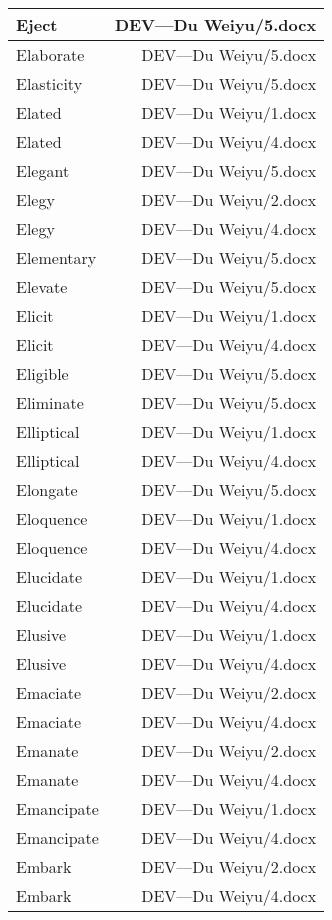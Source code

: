 \documentclass{article}
\begin{document}
\begin{center}
\begin{longtable}{|l|r|}
\hline
Eject  &  DEV---Du Weiyu/5.docx\\  
\hline
Elaborate  &  DEV---Du Weiyu/5.docx\\  
\hline
Elasticity  &  DEV---Du Weiyu/5.docx\\  
\hline
Elated  &  DEV---Du Weiyu/1.docx\\  
\hline
Elated  &  DEV---Du Weiyu/4.docx\\  
\hline
Elegant  &  DEV---Du Weiyu/5.docx\\  
\hline
Elegy  &  DEV---Du Weiyu/2.docx\\  
\hline
Elegy  &  DEV---Du Weiyu/4.docx\\  
\hline
Elementary  &  DEV---Du Weiyu/5.docx\\  
\hline
Elevate  &  DEV---Du Weiyu/5.docx\\  
\hline
Elicit  &  DEV---Du Weiyu/1.docx\\  
\hline
Elicit  &  DEV---Du Weiyu/4.docx\\  
\hline
Eligible  &  DEV---Du Weiyu/5.docx\\  
\hline
Eliminate  &  DEV---Du Weiyu/5.docx\\  
\hline
Elliptical  &  DEV---Du Weiyu/1.docx\\  
\hline
Elliptical  &  DEV---Du Weiyu/4.docx\\  
\hline
Elongate  &  DEV---Du Weiyu/5.docx\\  
\hline
Eloquence  &  DEV---Du Weiyu/1.docx\\  
\hline
Eloquence  &  DEV---Du Weiyu/4.docx\\  
\hline
Elucidate  &  DEV---Du Weiyu/1.docx\\  
\hline
Elucidate  &  DEV---Du Weiyu/4.docx\\  
\hline
Elusive  &  DEV---Du Weiyu/1.docx\\  
\hline
Elusive  &  DEV---Du Weiyu/4.docx\\  
\hline
Emaciate  &  DEV---Du Weiyu/2.docx\\  
\hline
Emaciate  &  DEV---Du Weiyu/4.docx\\  
\hline
Emanate  &  DEV---Du Weiyu/2.docx\\  
\hline
Emanate  &  DEV---Du Weiyu/4.docx\\  
\hline
Emancipate  &  DEV---Du Weiyu/1.docx\\  
\hline
Emancipate  &  DEV---Du Weiyu/4.docx\\  
\hline
Embark  &  DEV---Du Weiyu/2.docx\\  
\hline
Embark  &  DEV---Du Weiyu/4.docx\\  

\end{longtable}
\end{center}
\end{document}
